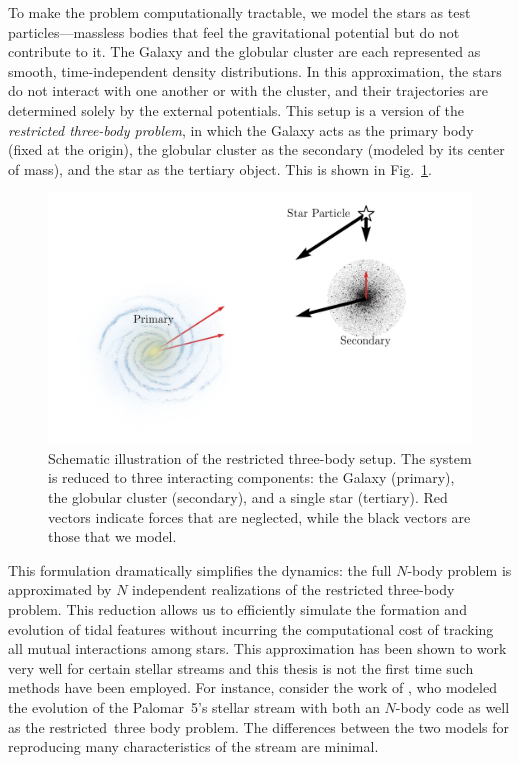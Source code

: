     To make the problem computationally tractable, we model the stars as test particles—massless bodies that feel the gravitational potential but do not contribute to it. The Galaxy and the globular cluster are each represented as smooth, time-independent density distributions. In this approximation, the stars do not interact with one another or with the cluster, and their trajectories are determined solely by the external potentials. This setup is a version of the \textit{restricted three-body problem}, in which the Galaxy acts as the primary body (fixed at the origin), the globular cluster as the secondary (modeled by its center of mass), and the star as the tertiary object. This is shown in Fig.~\ref{fig:restricted_three_body_set_up}.
    \begin{figure}
        \centering
        \includegraphics[width=.8\linewidth]{images/restricted_three_body_set_up.png}
        \caption{Schematic illustration of the restricted three-body setup. The system is reduced to three interacting components: the Galaxy (primary), the globular cluster (secondary), and a single star (tertiary). Red vectors indicate forces that are neglected, while the black vectors are those that we model.}
        \label{fig:restricted_three_body_set_up}
    \end{figure}
    This formulation dramatically simplifies the dynamics: the full $N$-body problem is approximated by \(N\) independent realizations of the restricted three-body problem. This reduction allows us to efficiently simulate the formation and evolution of tidal features without incurring the computational cost of tracking all mutual interactions among stars. This approximation has been shown to work very well for certain stellar streams and this thesis is not the first time such methods have been employed. For instance, consider the work of \citet{2012A&A...546L...7M}, who modeled the evolution of the Palomar~5's stellar stream with both an $N$-body code as well as the restricted~three body problem. The differences between the two models for reproducing many characteristics of the stream are minimal. 

